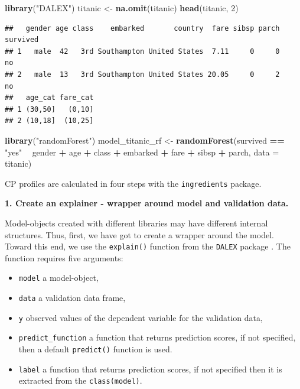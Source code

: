 \documentclass[12pt,]{krantz}
\newenvironment{Shaded}{\begin{snugshade}}{\end{snugshade}}
\newcommand{\DataTypeTok}[1]{\textcolor[rgb]{0.13,0.29,0.53}{#1}}
\newcommand{\DecValTok}[1]{\textcolor[rgb]{0.00,0.00,0.81}{#1}}
\newcommand{\KeywordTok}[1]{\textcolor[rgb]{0.13,0.29,0.53}{\textbf{#1}}}
\newcommand{\NormalTok}[1]{#1}
\newcommand{\OperatorTok}[1]{\textcolor[rgb]{0.81,0.36,0.00}{\textbf{#1}}}
\newcommand{\StringTok}[1]{\textcolor[rgb]{0.31,0.60,0.02}{#1}}
\providecommand{\tightlist}{%
  \setlength{\itemsep}{0pt}\setlength{\parskip}{0pt}}
\theoremstyle{definition}
\theoremstyle{definition}
\theoremstyle{definition}
\theoremstyle{remark}
\begin{document}
\begin{Shaded}
\begin{Highlighting}[]
\KeywordTok{library}\NormalTok{(}\StringTok{"DALEX"}\NormalTok{)}
\NormalTok{titanic <-}\StringTok{ }\KeywordTok{na.omit}\NormalTok{(titanic)}
\KeywordTok{head}\NormalTok{(titanic, }\DecValTok{2}\NormalTok{)}
\end{Highlighting}
\end{Shaded}

\begin{verbatim}
##   gender age class    embarked       country  fare sibsp parch survived
## 1   male  42   3rd Southampton United States  7.11     0     0       no
## 2   male  13   3rd Southampton United States 20.05     0     2       no
##   age_cat fare_cat
## 1 (30,50]   (0,10]
## 2 (10,18]  (10,25]
\end{verbatim}

\begin{Shaded}
\begin{Highlighting}[]
\KeywordTok{library}\NormalTok{(}\StringTok{"randomForest"}\NormalTok{)}
\NormalTok{model_titanic_rf <-}\StringTok{ }\KeywordTok{randomForest}\NormalTok{(survived }\OperatorTok{==}\StringTok{ "yes"} \OperatorTok{~}\StringTok{ }\NormalTok{gender }\OperatorTok{+}\StringTok{ }\NormalTok{age }\OperatorTok{+}\StringTok{ }\NormalTok{class }\OperatorTok{+}\StringTok{ }\NormalTok{embarked }\OperatorTok{+}
\StringTok{                                   }\NormalTok{fare }\OperatorTok{+}\StringTok{ }\NormalTok{sibsp }\OperatorTok{+}\StringTok{ }\NormalTok{parch,  }\DataTypeTok{data =}\NormalTok{ titanic)}
\end{Highlighting}
\end{Shaded}

CP profiles are calculated in four steps with the \texttt{ingredients}
package.

\textbf{1. Create an explainer - wrapper around model and validation
data.}

Model-objects created with different libraries may have different
internal structures. Thus, first, we have got to create a wrapper around
the model. Toward this end, we use the \texttt{explain()} function from
the \texttt{DALEX} package \citep{R-DALEX}. The function requires five
arguments:

\begin{itemize}
\tightlist
\item
  \texttt{model} a model-object,
\item
  \texttt{data} a validation data frame,
\item
  \texttt{y} observed values of the dependent variable for the
  validation data,
\item
  \texttt{predict\_function} a function that returns prediction scores,
  if not specified, then a default \texttt{predict()} function is used.
\item
  \texttt{label} a function that returns prediction scores, if not
  specified then it is extracted from the \texttt{class(model)}.
\end{itemize}
\end{document}
